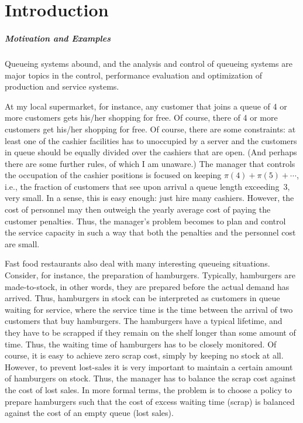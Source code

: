 \chapter*{Introduction}\label{sec:introduction}

\paragraph{Motivation and Examples}
Queueing systems abound, and the analysis and control of queueing
systems are major topics in the control, performance evaluation and
optimization of production and service systems. 


At my local supermarket, for instance, any customer that joins a queue
of 4 or more customers gets his/her shopping for free. Of course, there
of 4 or more customers get his/her shopping for free. Of course, there
are some constraints: at least one of the cashier facilities has to
unoccupied by a server and the customers in queue should be equally
divided over the cashiers that are open. (And perhaps there are some
further rules, of which I am unaware.) The manager that controls the
occupation of the cashier positions is focused on keeping
$\pi(4)+\pi(5)+\cdots$, i.e., the fraction of customers that see upon
arrival a queue length exceeding~3, very small. In a sense,
this is easy enough: just hire many cashiers. However, the cost of
personnel may then outweigh the yearly average cost of paying the
customer penalties. Thus, the manager's problem becomes to plan and
control the service capacity  in such a way that both
the penalties and the personnel cost are small.

Fast food restaurants also deal with many interesting queueing
situations. Consider, for instance, the preparation of
hamburgers. Typically, hamburgers are made-to-stock, in other words,
they are prepared before the actual demand has arrived. Thus, hamburgers
in stock can be interpreted as customers in queue waiting for service,
where the service time is the time between the arrival of two
customers that buy hamburgers. The hamburgers have a typical lifetime,
and they have to be scrapped if they remain on the shelf longer than
some amount of time. Thus, the waiting time of hamburgers has to be
closely monitored. Of course, it is easy to achieve zero scrap cost,
simply by keeping no stock at all.  However, to prevent lost-sales it
is very important to maintain a certain amount of hamburgers on
stock. Thus, the manager has to balance the scrap cost against the
cost of lost sales. In more formal terms, the problem is to choose a
policy to prepare hamburgers such that the cost of excess waiting time
(scrap) is balanced against the cost of an empty queue (lost sales).

